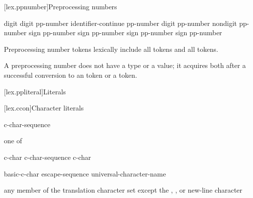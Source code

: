 [lex.ppnumber]{Preprocessing numbers}

%
\begin{bnf}
\br
    digit\br
     digit\br
    pp-number identifier-continue\br
    pp-number  digit\br
    pp-number  nondigit\br
    pp-number  sign\br
    pp-number  sign\br
    pp-number  sign\br
    pp-number  sign\br
    pp-number 
\end{bnf}

\pnum
Preprocessing number tokens lexically include
all  tokens and
all  tokens.

\pnum
A preprocessing number does not have a type or a value; it acquires both
after a successful conversion to
an  token or
a  token.%

[lex.ppliteral]{Literals}

[lex.ccon]{Character literals}

%
\begin{bnf}
\br
      c-char-sequence 
\end{bnf}

\begin{bnf}
 \textnormal{one of}\br
    \quad{}\quad{}\quad{}
\end{bnf}

\begin{bnf}
\br
    c-char\br
    c-char-sequence c-char
\end{bnf}

\begin{bnf}
\br
    basic-c-char\br
    escape-sequence\br
    universal-character-name
\end{bnf}

\begin{bnf}
\br
    \textnormal{any member of the translation character set except the ,}\br
    \bnfindent\textnormal{, or new-line character}
\end{bnf}

